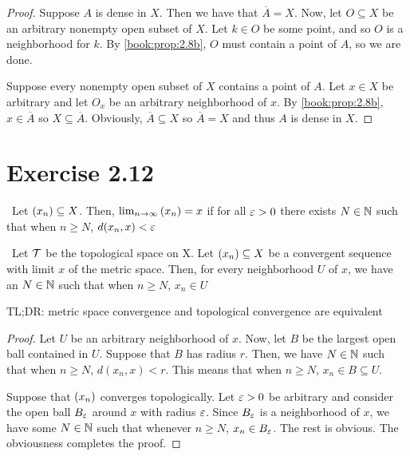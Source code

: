 \documentclass{article}
\newcommand*{\cl}[1]{\overline{#1}}
\begin{document}
\begin{proof}
    \forwarddir Suppose $A$ is dense in $X$. Then we have that $\overline{A} = X$.
    Now, let $O \subseteq X$ be an arbitrary nonempty open subset of $X$. Let $k \in O$
    be some point, and so $O$ is a neighborhood for $k$. By \cref{book:prop:2.8b}, $O$ must
    contain a point of $A$, so we are done.

    \conversedir Suppose every nonempty open subset of $X$ contains a point of $A$.
    Let $x \in X$ be arbitrary and let $O_x$ be an arbitrary neighborhood of $x$.
    By \cref{book:prop:2.8b}, $x \in \cl{A}$ so $X \subseteq \cl{A}$.
    Obviously, $\cl{A} \subseteq X$ so $\cl{A} = X$ and thus $A$ is dense in $X$.
\end{proof}


\newpage
\section{Exercise 2.12}

\begin{recall}
\metricspace \, Let $\left(x_{n}\right) \subseteq X$. Then, $ \lim_{n \to \infty}{\left(x_{n}\right)}  = x$ if 
for all $\varepsilon > 0$ there exists $N \in \mathbb{N}$ such that when $n \geq N$, $d(x_n, x) < \varepsilon$
\end{recall}

\begin{proposition}
\label{book:ex:2.12}
\metricspace \, Let $\mathcal{T}$ be the topological space on X. Let $\left(x_{n}\right) \subseteq X$
be a convergent sequence with limit $x$ of the metric space.
Then, for every neighborhood $U$ of $x$, we have an $N \in \mathbb{N}$
such that when $n \geq N$, $x_n \in U$ 

TL;DR: metric space convergence and topological convergence are equivalent 
\end{proposition}

\begin{proof}
    Let $U$ be an arbitrary neighborhood of $x$.
    Now, let $B$ be the largest open ball contained in $U$.
    Suppose that $B$ has radius $r$. Then, we have $N \in \mathbb{N}$
    such that when $n \geq N$, $d(x_n, x) < r$. This means that
    when $n \geq N$, $x_n \in B \subseteq U$.

    Suppose that $\left(x_{n}\right)$ converges topologically. 
    Let $\varepsilon > 0$ be arbitrary and consider the open ball
    $B_\varepsilon$ around $x$ with radius $\varepsilon$. Since $B_\varepsilon$ is
    a neighborhood of $x$, we have some $N \in \mathbb{N}$ such that
    whenever $n \geq N$, $x_n \in B_\varepsilon$. The rest is obvious.
    The obviousness completes the proof.
\end{proof}
\end{document}
